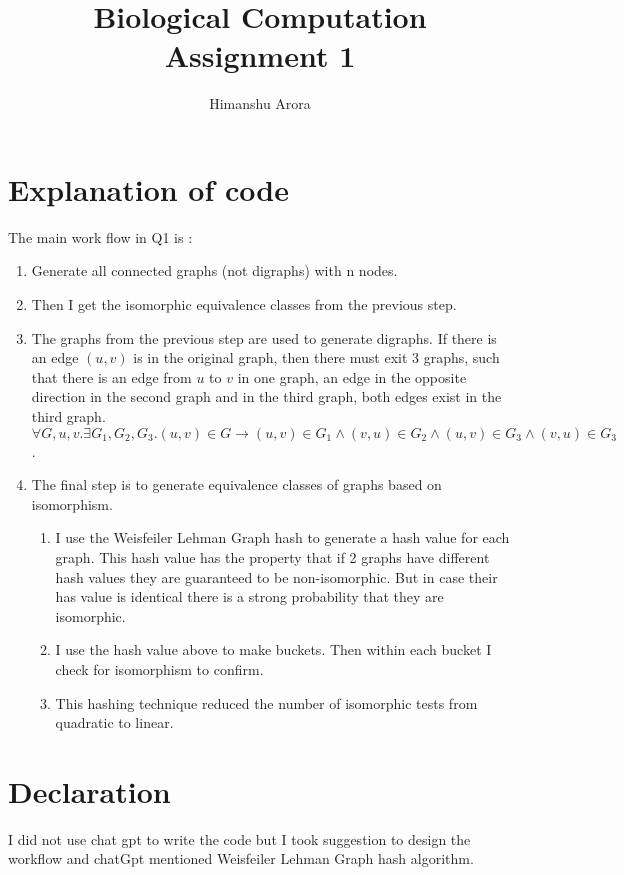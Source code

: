 \documentclass{article}
\title{Biological Computation\\ Assignment 1}
\author{Himanshu Arora}
\begin{document}
\maketitle

\section*{Explanation of code}
The main work flow in Q1 is :
\begin{enumerate}
\item Generate all connected graphs (not digraphs) with n nodes.
\item Then I get the isomorphic equivalence classes from the previous step.
\item The graphs from the previous step are used to generate
  digraphs. If there is an edge $(u,v)$ is in the original graph, then
  there must exit 3 graphs, such that there is an edge from $u$ to $v$
  in one graph, an edge in the opposite direction in the second graph
  and in the third graph, both edges exist in the third graph.\\
  
  $\forall
  G, u, v. \exists G_1, G_2, G_3. (u, v) \in G \rightarrow (u, v) \in
  G_1 \wedge (v, u) \in G_2 \wedge (u, v) \in G_3 \wedge (v,u) \in G_3
  $.

\item The final step is to generate equivalence classes of graphs based
  on isomorphism.
  \begin{enumerate}
   \item I use the Weisfeiler Lehman Graph hash to generate a hash
     value for each graph. This hash value has the property that if 2
     graphs have different hash values they are guaranteed to be
     non-isomorphic. But in case their has value is identical there is
     a strong probability that they are isomorphic. 
   \item I use the hash value above to make buckets. Then within each
     bucket I check for isomorphism to confirm.
   \item This hashing technique reduced the number of isomorphic tests
     from quadratic to linear. 
  \end{enumerate}
  
\end{enumerate}

\section*{Declaration}
I did not use chat gpt to write the code but I took suggestion to
design the workflow and chatGpt mentioned Weisfeiler Lehman Graph hash
algorithm.
\end{document}
